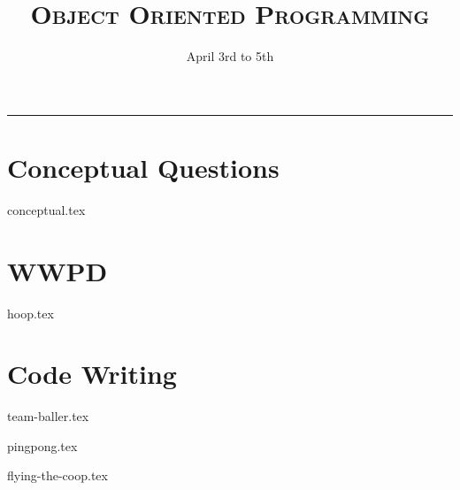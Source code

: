 \documentclass{exam}
\title{\textsc{Object Oriented Programming}}
\date{April 3rd to 5th}
\begin{document}
\maketitle
\rule{\textwidth}{0.15em}
\fontsize{12}{15}\selectfont


\begin{questions}
\section{Conceptual Questions}
{conceptual.tex}

\newpage
\section{WWPD}

{hoop.tex}
\newpage

\section{Code Writing}
{team-baller.tex}

{pingpong.tex}

{flying-the-coop.tex}

\end{questions}
\end{document}
